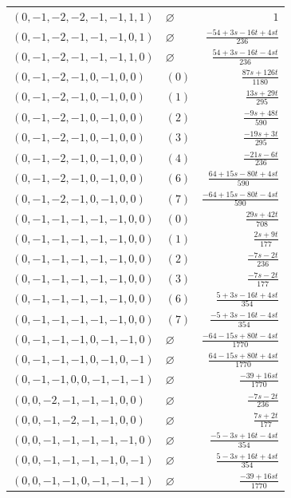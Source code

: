 \begin{longtable}{@{}llr@{}}
$(0,-1,-2,-2,-1,-1,1,1)$ & $\varnothing$ & $1$\\
$(0,-1,-2,-1,-1,-1,0,1)$ & $\varnothing$ & $\frac{-54+3s-16t+4st}{236}$\\
$(0,-1,-2,-1,-1,-1,1,0)$ & $\varnothing$ & $\frac{54+3s-16t-4st}{236}$\\
$(0,-1,-2,-1,0,-1,0,0)$ & $(0)$ & $\frac{87s+126t}{1180}$\\
$(0,-1,-2,-1,0,-1,0,0)$ & $(1)$ & $\frac{13s+29t}{295}$\\
$(0,-1,-2,-1,0,-1,0,0)$ & $(2)$ & $\frac{-9s+48t}{590}$\\
$(0,-1,-2,-1,0,-1,0,0)$ & $(3)$ & $\frac{-19s+3t}{295}$\\
$(0,-1,-2,-1,0,-1,0,0)$ & $(4)$ & $\frac{-21s-6t}{236}$\\
$(0,-1,-2,-1,0,-1,0,0)$ & $(6)$ & $\frac{64+15s-80t+4st}{590}$\\
$(0,-1,-2,-1,0,-1,0,0)$ & $(7)$ & $\frac{-64+15s-80t-4st}{590}$\\
$(0,-1,-1,-1,-1,-1,0,0)$ & $(0)$ & $\frac{29s+42t}{708}$\\
$(0,-1,-1,-1,-1,-1,0,0)$ & $(1)$ & $\frac{2s+9t}{177}$\\
$(0,-1,-1,-1,-1,-1,0,0)$ & $(2)$ & $\frac{-7s-2t}{236}$\\
$(0,-1,-1,-1,-1,-1,0,0)$ & $(3)$ & $\frac{-7s-2t}{177}$\\
$(0,-1,-1,-1,-1,-1,0,0)$ & $(6)$ & $\frac{5+3s-16t+4st}{354}$\\
$(0,-1,-1,-1,-1,-1,0,0)$ & $(7)$ & $\frac{-5+3s-16t-4st}{354}$\\
$(0,-1,-1,-1,0,-1,-1,0)$ & $\varnothing$ & $\frac{-64-15s+80t-4st}{1770}$\\
$(0,-1,-1,-1,0,-1,0,-1)$ & $\varnothing$ & $\frac{64-15s+80t+4st}{1770}$\\
$(0,-1,-1,0,0,-1,-1,-1)$ & $\varnothing$ & $\frac{-39+16st}{1770}$\\
$(0,0,-2,-1,-1,-1,0,0)$ & $\varnothing$ & $\frac{-7s-2t}{236}$\\
$(0,0,-1,-2,-1,-1,0,0)$ & $\varnothing$ & $\frac{7s+2t}{177}$\\
$(0,0,-1,-1,-1,-1,-1,0)$ & $\varnothing$ & $\frac{-5-3s+16t-4st}{354}$\\
$(0,0,-1,-1,-1,-1,0,-1)$ & $\varnothing$ & $\frac{5-3s+16t+4st}{354}$\\
$(0,0,-1,-1,0,-1,-1,-1)$ & $\varnothing$ & $\frac{-39+16st}{1770}$\\
\end{longtable}
\endgroup
